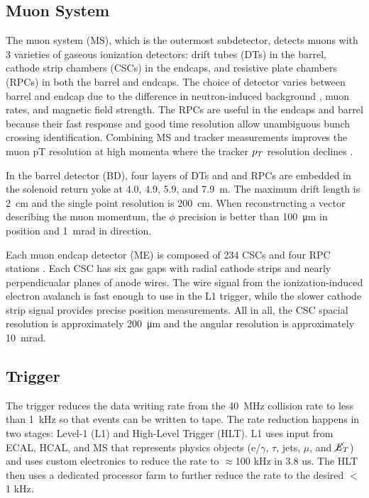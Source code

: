 \documentclass[12pt]{article}
\begin{document}
    \subsection{Muon System}
        The muon system (MS), which is the outermost subdetector, detects muons with \num{3} varieties of gaseous ionization detectors: drift tubes (DTs) in the barrel, cathode strip chambers (CSCs) in the endcaps, and resistive plate chambers (RPCs) in both the barrel and endcaps. The choice of detector varies between barrel and endcap due to the difference in neutron-induced background , muon rates, and magnetic field strength. The RPCs are useful in the endcaps and barrel because their fast response and good time resolution allow unambiguous bunch crossing identification. Combining MS and tracker measurements improves the muon pT resolution at high momenta where the tracker $p_T$ resolution declines \cite{cms_experiment, cms_tdr}.

        In the barrel detector (BD), four layers of DTs and and RPCs are embedded in the solenoid return yoke at \num{4.0}, \num{4.9}, \num{5.9}, and \SI{7.9}{m}. The maximum drift length is \SI{2}{\cm} and the single point resolution is \SI{200}{\cm}. When reconstructing a vector describing the muon momentum, the $\phi$ precision is better than \SI{100}{\micro\m} in position and \SI{1}{\milli\radian} in direction. 

        Each muon endcap detector (ME) is composed of \num{234} CSCs and four RPC stations . Each CSC has six gas gaps with radial cathode strips and nearly perpendicualar planes of anode wires. The wire signal from the ionization-induced electron avalanch is fast enough to use in the L1 trigger, while the slower  cathode strip signal provides precise  position measurements. All in all, the CSC spacial resolution is approximately \SI{200}{\micro\m} and the angular resolution is approximately \SI{10}{\milli\radian}.

    \subsection{Trigger}
        The trigger reduces the data writing rate from the \SI{40}{\mega\hertz} collision rate to less than \SI{1}{\kilo\hertz} so that events can be written to tape. The rate reduction happens in two stages: Level-1 (L1) and High-Level Trigger (HLT). L1 uses input from ECAL, HCAL, and MS that represents physics objects ($\mathrm{e}$/$\gamma$, $\tau$, jets, $\mu$, and $\cancel{\it{E}}_{T}$) and uses custom electronics to reduce the rate to $\approx$100 kHz in 3.8 us. The HLT then uses a dedicated processor farm to further reduce the rate to the desired $<$ 1 kHz\cite{cms_experiment, cms_trigger_upgrade}.
\end{document}
